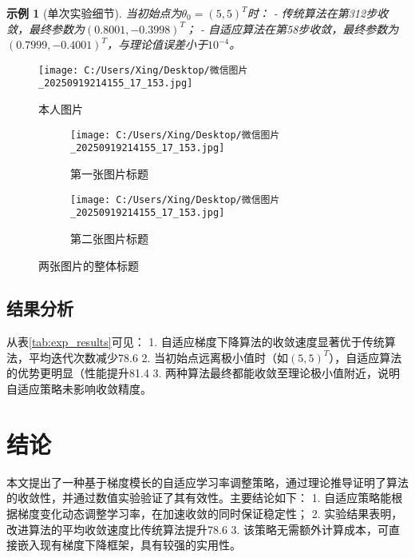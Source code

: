 \documentclass[12pt,a4paper,oneside]{article} %
\newtheorem{example}{示例}[section]
\begin{document}
\begin{example}[单次实验细节]
当初始点为$\theta_0 = (5, 5)^T$时：
- 传统算法在第312步收敛，最终参数为$(0.8001, -0.3998)^T$；
- 自适应算法在第58步收敛，最终参数为$(0.7999, -0.4001)^T$，与理论值误差小于$10^{-4}$。
\end{example}

\begin{figure}[H]  %
    \centering  %
    \texttt{[image: C:/Users/Xing/Desktop/微信图片\_20250919214155\_17\_153.jpg]}
    \caption{本人图片}  %
    \label{fig:wechat}  %
\end{figure}
\begin{figure}[H]
    \centering  %
    \hspace{0.10\textwidth}
    \begin{subfigure}[b]{0.3\textwidth}  %
        \centering
        \texttt{[image: C:/Users/Xing/Desktop/微信图片\_20250919214155\_17\_153.jpg]}
        \caption{第一张图片标题}
        \label{fig:sub1}
    \end{subfigure}
    \hfill  %
    \begin{subfigure}[b]{0.3\textwidth}
        \centering
        \texttt{[image: C:/Users/Xing/Desktop/微信图片\_20250919214155\_17\_153.jpg]}
        \caption{第二张图片标题}
        \label{fig:sub2}
    
    \end{subfigure}
    \hspace{0.10\textwidth}
    \caption{两张图片的整体标题}
    \label{fig:total}
\end{figure}
\subsection{结果分析}
从表\ref{tab:exp_results}可见：
1. 自适应梯度下降算法的收敛速度显著优于传统算法，平均迭代次数减少78.6%
2. 当初始点远离极小值时（如$(5,5)^T$），自适应算法的优势更明显（性能提升81.4%
3. 两种算法最终都能收敛至理论极小值附近，说明自适应策略未影响收敛精度。


\section{结论}
本文提出了一种基于梯度模长的自适应学习率调整策略，通过理论推导证明了算法的收敛性，并通过数值实验验证了其有效性。主要结论如下：
1. 自适应策略能根据梯度变化动态调整学习率，在加速收敛的同时保证稳定性；
2. 实验结果表明，改进算法的平均收敛速度比传统算法提升78.6%
3. 该策略无需额外计算成本，可直接嵌入现有梯度下降框架，具有较强的实用性。
\end{document}
